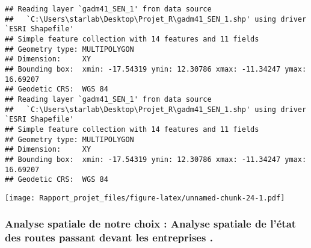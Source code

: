 \documentclass[
]{article}
\begin{document}
\begin{verbatim}
## Reading layer `gadm41_SEN_1' from data source 
##   `C:\Users\starlab\Desktop\Projet_R\gadm41_SEN_1.shp' using driver `ESRI Shapefile'
## Simple feature collection with 14 features and 11 fields
## Geometry type: MULTIPOLYGON
## Dimension:     XY
## Bounding box:  xmin: -17.54319 ymin: 12.30786 xmax: -11.34247 ymax: 16.69207
## Geodetic CRS:  WGS 84
## Reading layer `gadm41_SEN_1' from data source 
##   `C:\Users\starlab\Desktop\Projet_R\gadm41_SEN_1.shp' using driver `ESRI Shapefile'
## Simple feature collection with 14 features and 11 fields
## Geometry type: MULTIPOLYGON
## Dimension:     XY
## Bounding box:  xmin: -17.54319 ymin: 12.30786 xmax: -11.34247 ymax: 16.69207
## Geodetic CRS:  WGS 84
\end{verbatim}

\texttt{[image: Rapport\_projet\_files/figure-latex/unnamed-chunk-24-1.pdf]}

\hypertarget{analyse-spatiale-de-notre-choix-analyse-spatiale-de-luxe9tat-des-routes-passant-devant-les-entreprises-.}{%
\subsubsection{Analyse spatiale de notre choix : Analyse spatiale de
l'état des routes passant devant les entreprises
.}\label{analyse-spatiale-de-notre-choix-analyse-spatiale-de-luxe9tat-des-routes-passant-devant-les-entreprises-.}}
\end{document}
